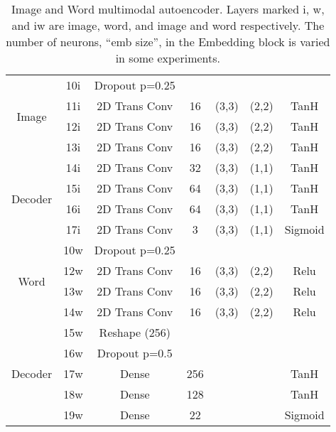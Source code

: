\begin{table}
\begin{tabular}{|c|c|c|c|c|c|c|}
			
			\multirow{4}{*}{Image} & 10i 	&	Dropout p=0.25 &	 & 	     &       & \\ \cline{2-7}
			& 11i	&	2D Trans Conv & 16 & (3,3) & (2,2)  & TanH \\ \cline{2-7}
			& 12i	&	2D Trans Conv & 16 & (3,3) & (2,2)  & TanH \\ \cline{2-7}
			& 13i	&	2D Trans Conv & 16 & (3,3) & (2,2)  & TanH \\ \cline{2-7}
\multirow{4}{*}{Decoder}& 14i	&	2D Trans Conv & 32 & (3,3) & (1,1)  & TanH \\ \cline{2-7}
			& 15i	&	2D Trans Conv & 64 & (3,3) & (1,1)  & TanH \\ \cline{2-7}
			& 16i	&	2D Trans Conv & 64 & (3,3) & (1,1)  & TanH \\ \cline{2-7}
			& 17i	&	2D Trans Conv & 3 & (3,3) & (1,1) & Sigmoid\\ \hline 

			\multirow{4}{*}{Word} & 10w 	&	Dropout p=0.25 &	 & 	     &       & \\ \cline{2-7}
			& 12w	&	2D Trans Conv & 16 & (3,3) & (2,2)  & Relu \\ \cline{2-7}
			& 13w	&	2D Trans Conv & 16 & (3,3) & (2,2)  & Relu \\ \cline{2-7}
			& 14w	&	2D Trans Conv & 16 & (3,3) & (2,2)  & Relu \\ \cline{2-7}
\multirow{5}{*}{Decoder}& 15w	& Reshape (256) & & & & \\ \cline{2-7}
			& 16w	& Dropout p=0.5 &	 & 	     &       & \\ \cline{2-7}
			& 17w	& Dense & 256 & & &TanH \\ \cline{2-7}
			& 18w	& Dense & 128 & & &TanH \\ \cline{2-7}
			& 19w	& Dense & 22 & & & Sigmoid \\ \hline
			
			
		\end{tabular}
		\caption{Image and Word multimodal autoencoder. Layers marked i, w, and iw are image, word, and image and word respectively. The number of neurons, ``emb size'', in the Embedding block is varied in some experiments.}
		\label{tab:Arts_MAE_description}

	\end{table}
